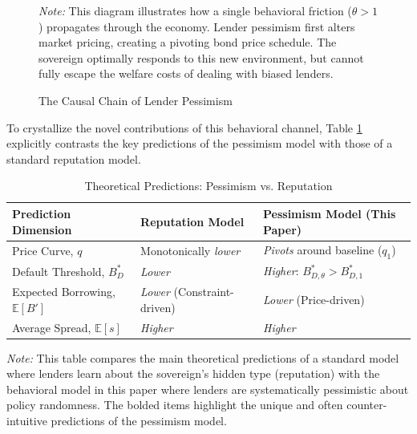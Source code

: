 \documentclass[12pt]{article}
\theoremstyle{plain}
\begin{document}
\begin{figure}[htb]
\begin{tikzpicture}
	\end{tikzpicture}
	\caption{The Causal Chain of Lender Pessimism}
	\label{fig:causal_chain}
	\parbox{\linewidth}{\small\textit{Note:} This diagram illustrates how a single behavioral friction ($\theta > 1$) propagates through the economy. Lender pessimism first alters market pricing, creating a pivoting bond price schedule. The sovereign optimally responds to this new environment, but cannot fully escape the welfare costs of dealing with biased lenders.}
\end{figure}
To crystallize the novel contributions of this behavioral channel, Table
\ref{tab:prediction_comparison} explicitly contrasts the key predictions of the
pessimism model with those of a standard reputation model.

\begin{table}[h!]
	\centering
	\caption{Theoretical Predictions: Pessimism vs. Reputation}
	\label{tab:prediction_comparison}
	\begin{tabularx}{\textwidth}{@{}lXX@{}}
		\toprule
		Prediction Dimension                 & Reputation Model \citep{ColeDowEnglish1995, MorelliMoretti2023} & Pessimism Model (This Paper)                  \\ \midrule
		Price Curve, $q$                     & Monotonically \textit{lower}                                    & \textit{Pivots} around baseline ($q_1$)       \\
		Default Threshold, $B^*_D$           & \textit{Lower}                                                  & \textit{Higher}: $B^*_{D,\theta} > B^*_{D,1}$ \\
		Expected Borrowing, $\mathbb{E}[B']$ & \textit{Lower} (Constraint-driven)                              & \textit{Lower} (Price-driven)                 \\
		Average Spread, $\mathbb{E}[s]$      & \textit{Higher}                                                 & \textit{Higher}                               \\ \bottomrule
	\end{tabularx}
	\parbox{\linewidth}{\small\textit{Note:} This table compares the main theoretical predictions of a standard model where lenders learn about the sovereign's hidden type (reputation) with the behavioral model in this paper where lenders are systematically pessimistic about policy randomness. The bolded items highlight the unique and often counter-intuitive predictions of the pessimism model.}
\end{table}
\end{document}
